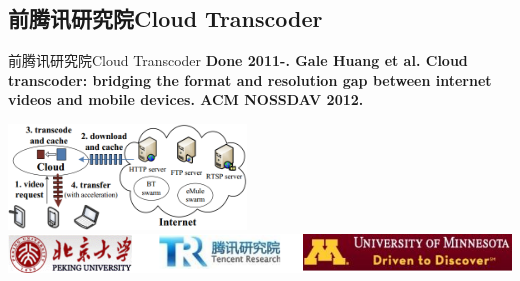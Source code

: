 \documentclass{beamer}
\begin{document}
\subsection{前腾讯研究院Cloud Transcoder}
\begin{frame}{前腾讯研究院Cloud Transcoder}
\textbf{Done 2011-. Gale Huang et al. Cloud transcoder: bridging the format and resolution gap between internet videos and mobile devices. ACM NOSSDAV 2012.}\\\pause
\begin{center}
\includegraphics[height=2.8cm]{fig/clouder-transcoder_principle.png}\\\pause
\includegraphics[scale=0.36]{fig/cloud_transcoder_nossdav_affiliation.png}
\end{center}
\end{frame}
\end{document}
